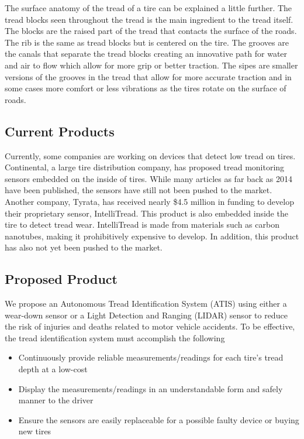\documentclass[11pt]{IEEEtran}
\begin{document}
			The surface anatomy of the tread of a tire can be explained a little further. The tread blocks seen throughout the tread is the main ingredient to the tread itself. The blocks are the raised part of the tread that contacts the surface of the roads. The rib is the same as tread blocks but is centered on the tire. The grooves are the canals that separate the tread blocks creating an innovative path for water and air to flow which allow for more grip or better traction. The sipes are smaller versions of the grooves in the tread that allow for more accurate traction and in some cases more comfort or less vibrations as the tires rotate on the surface of roads. 

		\subsection{Current Products}
			Currently, some companies are working on devices that detect low tread on tires. Continental, a large tire distribution company, has proposed tread monitoring sensors embedded on the inside of tires. While many articles as far back as 2014 have been published, the sensors have still not been pushed to the market. Another company, Tyrata, has received nearly \$4.5 million in funding to develop their proprietary sensor, IntelliTread. This product is also embedded inside the tire to detect tread wear. IntelliTread is made from materials such as carbon nanotubes, making it prohibitively expensive to develop. In addition, this product has also not yet been pushed to the market.

		\subsection{Proposed Product}
			We propose an Autonomous Tread Identification System (ATIS) using either a wear-down sensor or a Light Detection and Ranging (LIDAR) sensor to reduce the risk of injuries and deaths related to motor vehicle accidents. To be effective, the tread identification system must accomplish the following

			\begin{itemize}
				\item Continuously provide reliable measurements/readings for each tire’s tread depth at a low-cost
				\item Display the measurements/readings in an understandable form and safely manner to the driver
				\item Ensure the sensors are easily replaceable for a possible faulty device or buying new tires 
			\end{itemize}
\end{document}
